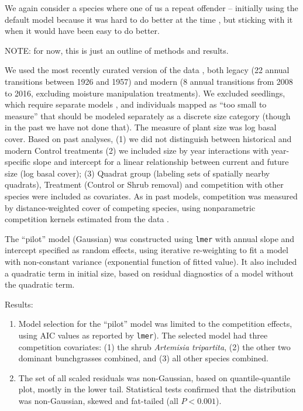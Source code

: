 \documentclass[11pt]{article}
\begin{document}
{We again consider a species where one of us a repeat offender -- initially using the default model because 
it was hard to do better at the time \citep{adler-etal-2010}, but sticking with it 
\citep[e.g.,][]{Tredennick2018, Adler-2018} when it would have been easy to do better.   

NOTE: for now, this is just an outline of methods and results. 

We used the most recently curated version of the data \citep[][at doi.org/10.5061/dryad.96dn293]{Adler-2018},
both legacy (22 annual transitions between 1926 and 1957) and modern (8 annual transitions from
2008 to 2016, excluding moisture manipulation treatments). We excluded seedlings, which require separate models
\citep{Chu-2014a, Chu-2015, snyder-ellner-2018}, and individuals mapped as ``too small to measure'' that should be modeled separately
as a discrete size category (though in the past we have not done that). The measure of plant size was log basal cover. 
Based on past analyses, (1) we did not distinguish between historical and 
modern Control treatments \citep{Adler-2018} (2) we included size by year interactions with year-specific slope and intercept
for a linear relationship between current and future size (log basal cover); (3) Quadrat group (labeling sets of spatially
nearby quadrats), Treatment (Control or Shrub removal) and competition with other species were included as covariates. 
As in past models, competition was measured by distance-weighted cover of competing species, using nonparametric competition
kernels estimated from the data \citep{Teller-2016}. 

The ``pilot'' model (Gaussian) was constructed using \texttt{lmer} with annual slope and intercept specified 
as random effects, using iterative re-weighting to fit a model with non-constant variance (exponential function of fitted value). 
It also included a quadratic term in initial size, based on residual diagnostics of a model without the quadratic term. 

Results: \begin{enumerate}

\item Model selection for the ``pilot'' model was limited to the competition effects,  
using AIC values as reported by \texttt{lmer}). The selected model had  
three competition covariates: (1) the shrub \emph{Artemisia tripartita}, (2) the other two dominant 
bunchgrasses combined, and (3) all other species combined. 

\item The set of all scaled residuals was non-Gaussian, based on quantile-quantile plot, mostly in the lower tail. Statistical tests
confirmed that the distribution was non-Gaussian, skewed and fat-tailed (all $P<0.001$). 


\end{enumerate}}
\end{document}
